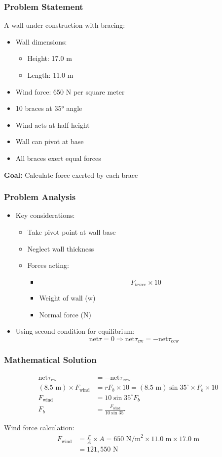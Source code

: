 \documentclass{beamer}
\begin{document}
\begin{frame}
\frametitle{Problem Statement}
A wall under construction with bracing:
\begin{itemize}
    \item Wall dimensions:
    \begin{itemize}
        \item Height: 17.0 m
        \item Length: 11.0 m
    \end{itemize}
    \item Wind force: 650 N per square meter
    \item 10 braces at 35° angle
    \item Wind acts at half height
    \item Wall can pivot at base
    \item All braces exert equal forces
\end{itemize}
\textbf{Goal:} Calculate force exerted by each brace
\end{frame}

\begin{frame}
\frametitle{Problem Analysis}
\begin{itemize}
    \item Key considerations:
    \begin{itemize}
        \item Take pivot point at wall base
        \item Neglect wall thickness
        \item Forces acting:
        \begin{itemize}
            \item $$F_{brace} \times 10$$
            \item Weight of wall (w)
            \item Normal force (N)
        \end{itemize}
    \end{itemize}
    \item Using second condition for equilibrium:
    $$\text{net}\tau = 0 \Rightarrow \text{net}\tau_{\text{cw}} = -\text{net}\tau_{\text{ccw}}$$
\end{itemize}
\end{frame}

\begin{frame}
\frametitle{Mathematical Solution}
\begin{align*}
\text{net}\tau_{\text{cw}} &= -\text{net}\tau_{\text{ccw}}\\
(8.5\text{ m}) \times F_{\text{wind}} &= rF_b \times 10 = (8.5\text{ m})\sin 35^\circ \times F_b \times 10 \\
F_{\text{wind}} &= 10\sin 35^\circ F_b \\
F_b &= \frac{F_{\text{wind}}}{10\sin 35^\circ}
\end{align*}

Wind force calculation:
\begin{align*}
F_{\text{wind}} &= \frac{F}{A} \times A = 650\text{ N/m}^2 \times 11.0\text{ m} \times 17.0\text{ m} \\
&= 121,550\text{ N}
\end{align*}
\end{frame}
\end{document}
